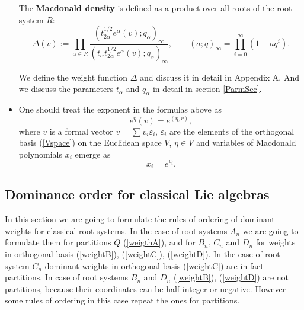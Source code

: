 \documentclass{article}
\def\ve{\varepsilon}
\begin{document}
\begin{itemize}
The \textbf{Macdonald density} is defined as a product over all roots of the root system $R$:
 \begin{equation}
     \Delta(v) := \prod_{\alpha \in R} \frac{\left(t_{2\alpha}^{1/2}e^{\alpha}(v);q_{\alpha}\right)_{\infty}}{\left(t_{\alpha}t_{2\alpha}^{1/2}e^{\alpha}(v);q_{\alpha}\right)_{\infty}}, \quad\quad (a;q)_{\infty} = \prod_{i=0}^{\infty} (1- aq^i).
 \end{equation}

We define the weight function $\Delta$ and discuss it in detail in Appendix A. And we discuss the parameters $t_{\alpha}$ and $q_{\alpha}$ in detail in section \ref{ParmSec}.

\item One should treat the exponent in the formulas above as
\begin{equation}
    e^{\eta} (v) = e^{(\eta,v)},
\end{equation}
where $v$ is a formal vector $v = \sum v_i \ve_i$, $\ve_i$ are the elements of the orthogonal basis (\ref{Vspace}) on the Euclidean space $V$, $\eta \in V$
and variables of Macdonald polynomials $x_i$ emerge as 
\begin{equation}
    x_i = e^{v_i}.
\end{equation}


\end{itemize}


\subsection{Dominance order for classical Lie algebras \label{DOrderSec}}

In this section we are going to formulate the rules of ordering of dominant weights for classical root systems. In the case of root systems $A_n$ we are going to formulate them for partitions $Q$ (\ref{weigthA}), and for $B_n$, $C_n$ and $D_n$ for weights in orthogonal basis (\ref{weightB}), (\ref{weightC}), (\ref{weightD}). In the case of root system $C_n$ dominant weights in orthogonal basis (\ref{weightC}) are in fact partitions. In case of root systems $B_n$ and $D_n$ (\ref{weightB}), (\ref{weightD}) are not partitions, because their coordinates can be half-integer or negative. However some rules of ordering in this case repeat the ones for partitions.
\end{document}
